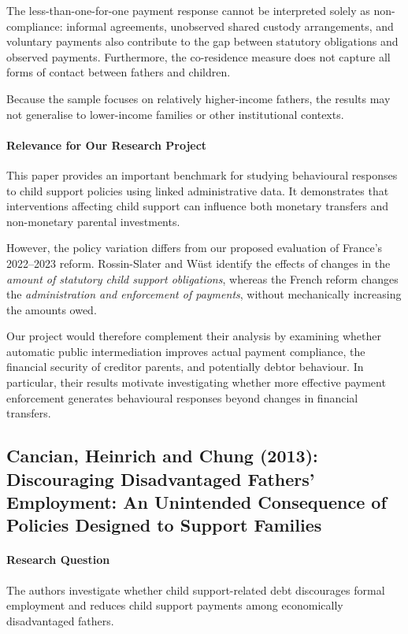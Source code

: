 \documentclass{article}
\begin{document}
The less-than-one-for-one payment response cannot be interpreted solely as non-compliance: informal agreements, unobserved shared custody arrangements, and voluntary payments also contribute to the gap between statutory obligations and observed payments. Furthermore, the co-residence measure does not capture all forms of contact between fathers and children.

Because the sample focuses on relatively higher-income fathers, the results may not generalise to lower-income families or other institutional contexts.

\paragraph{Relevance for Our Research Project}
This paper provides an important benchmark for studying behavioural responses to child support policies using linked administrative data. It demonstrates that interventions affecting child support can influence both monetary transfers and non-monetary parental investments.

However, the policy variation differs from our proposed evaluation of France's 2022--2023 reform. Rossin-Slater and Wüst identify the effects of changes in the \emph{amount of statutory child support obligations}, whereas the French reform changes the \emph{administration and enforcement of payments}, without mechanically increasing the amounts owed.

Our project would therefore complement their analysis by examining whether automatic public intermediation improves actual payment compliance, the financial security of creditor parents, and potentially debtor behaviour. In particular, their results motivate investigating whether more effective payment enforcement generates behavioural responses beyond changes in financial transfers.


\subsection{Cancian, Heinrich and Chung (2013):
Discouraging Disadvantaged Fathers' Employment:
An Unintended Consequence of Policies Designed to Support Families}

\paragraph{Research Question}

The authors investigate whether child support-related
debt discourages formal employment and reduces child
support payments among economically disadvantaged fathers.
\end{document}
